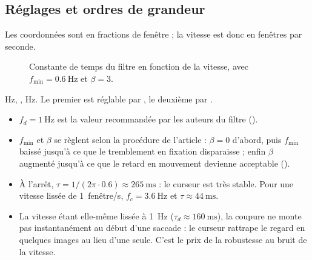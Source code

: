 \subsection{Réglages et ordres de grandeur}

Les coordonnées sont en fractions de fenêtre ; la vitesse est donc en fenêtres par seconde.

\begin{figure}[H]
\centering
{}
\caption{Constante de temps du filtre en fonction de la vitesse, avec $f_{\min} = \qty{0.6}{\hertz}$ et $\beta = 3$.}
\end{figure}

\begin{origine}
 Hz, ,  Hz. Le premier est réglable par , le deuxième par .
\begin{itemize}
  \item $f_d = \qty{1}{\hertz}$ est la valeur recommandée par les auteurs du filtre \cite{casiez2012} (\litt).
  \item $f_{\min}$ et $\beta$ se règlent selon la procédure de l'article : $\beta = 0$ d'abord, puis $f_{\min}$ baissé jusqu'à ce que le tremblement en fixation disparaisse ; enfin $\beta$ augmenté jusqu'à ce que le retard en mouvement devienne acceptable (\empi).
  \item À l'arrêt, $\tau = 1/(2\pi\cdot0.6) \approx \qty{265}{\milli\second}$ : le curseur est très stable. Pour une vitesse lissée de 1~fenêtre/s, $f_c = \qty{3.6}{\hertz}$ et $\tau \approx \qty{44}{\milli\second}$.
  \item La vitesse étant elle-même lissée à \qty{1}{\hertz} ($\tau_d \approx \qty{160}{\milli\second}$), la coupure ne monte pas instantanément au début d'une saccade : le curseur rattrape le regard en quelques images au lieu d'une seule. C'est le prix de la robustesse au bruit de la vitesse.
\end{itemize}
\end{origine}

